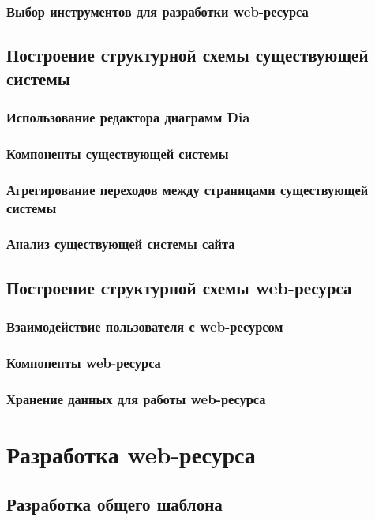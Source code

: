         \subsubsection{Выбор инструментов для разработки web-ресурса}

    \subsection{Построение структурной схемы существующей системы}
        \subsubsection{Использование редактора диаграмм Dia}
        \subsubsection{Компоненты существующей системы}
        \subsubsection{Агрегирование переходов между страницами существующей системы}
        \subsubsection{Анализ существующей системы сайта}

    \subsection{Построение структурной схемы web-ресурса}
        \subsubsection{Взаимодействие пользователя с web-ресурсом}
        \subsubsection{Компоненты web-ресурса}
        \subsubsection{Хранение данных для работы web-ресурса}

\section{Разработка web-ресурса}
    \subsection{Разработка общего шаблона}
